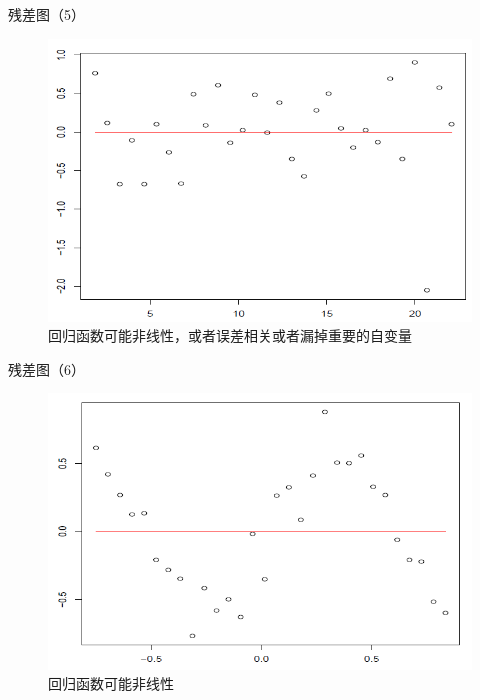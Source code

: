 \documentclass[ignorenonframetext,]{beamer}
\begin{document}
\begin{frame}{残差图（5）}
\protect\hypertarget{5}{}

\begin{figure}
\includegraphics[width=0.9\linewidth]{error5} \caption{回归函数可能非线性，或者误差相关或者漏掉重要的自变量}\label{fig:unnamed-chunk-18}
\end{figure}

\end{frame}

\begin{frame}{残差图（6）}
\protect\hypertarget{6}{}

\begin{figure}
\includegraphics[width=0.9\linewidth]{error6} \caption{回归函数可能非线性}\label{fig:unnamed-chunk-19}
\end{figure}

\end{frame}
\end{document}
